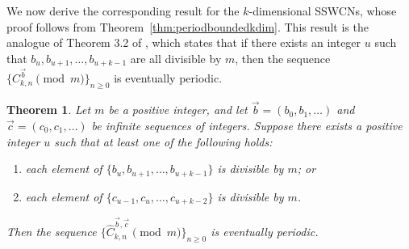 \documentclass[11pt]{article}
\newtheorem{theorem}{Theorem}[section]
\theoremstyle{remark}
\theoremstyle{definition}
\begin{document}
We now derive the corresponding result for the $k$-dimensional SSWCNs, whose proof follows from Theorem~\ref{thm:periodboundedkdim}. This result is the analogue of Theorem 3.2 of \cite{MR5034574}, which states that if there exists an integer $u$ such that $b_u, b_{u+1}, \dots, b_{u+k-1}$ are all divisible by $m$, then the sequence $\{C_{k,n}^{\vec{b}} \pmod{m}\}_{n \geq 0}$ is eventually periodic.

\begin{theorem}\label{thm:period-weighted-kdim}
Let $m$ be a positive integer, and let $\vec b=(b_0,b_1,\dots)$ and $\vec c=(c_0,c_1,\dots)$ be infinite sequences of integers. Suppose there exists a positive integer $u$ such that at least one of the following holds:
\begin{enumerate}
    \item each element of $\{b_u,b_{u+1},\dots,b_{u+k-1}\}$ is divisible by $m$; or
    \item each element of $\{c_{u-1},c_u,\dots,c_{u+k-2}\}$ is divisible by $m$.
\end{enumerate}
Then the sequence $\{\widehat{C}^{\vec{b},\vec{c}}_{k,n} \pmod{m}\}_{n\ge 0}$ is eventually periodic.
\end{theorem}
\end{document}
